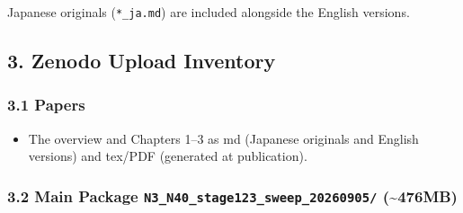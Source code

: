 \documentclass[
  a4paper,
]{ltjsarticle}
\providecommand{\tightlist}{%
  \setlength{\itemsep}{0pt}\setlength{\parskip}{0pt}}
\begin{document}
Japanese originals (\texttt{*\_ja.md}) are included alongside the
English versions.

\subsection{3. Zenodo Upload Inventory}\label{zenodo-upload-inventory}

\subsubsection{3.1 Papers}\label{papers}

\begin{itemize}
\tightlist
\item
  The overview and Chapters 1--3 as md (Japanese originals and English
  versions) and tex/PDF (generated at publication).
\end{itemize}

\subsubsection{\texorpdfstring{3.2 Main Package
\texttt{N3\_N40\_stage123\_sweep\_20260905/}
(\textasciitilde476MB)}{3.2 Main Package N3\_N40\_stage123\_sweep\_20260905/ (\textasciitilde476MB)}}\label{main-package-n3_n40_stage123_sweep_20260905-476mb}
\end{document}
